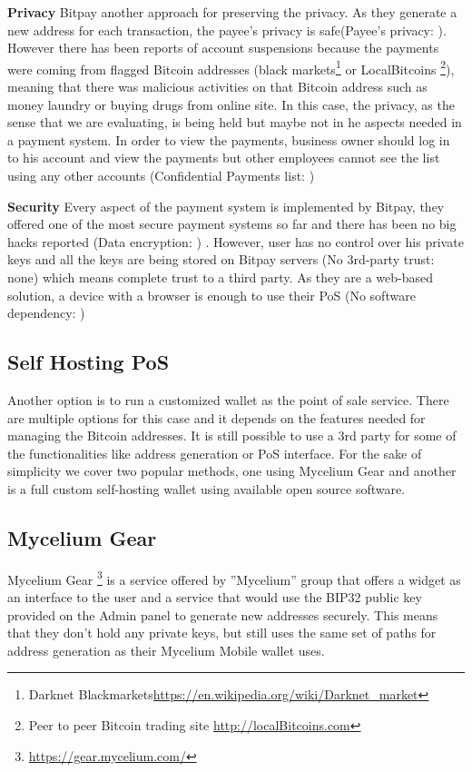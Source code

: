  \textbf{Privacy}
Bitpay another approach for preserving the privacy. As they generate a new address for each transaction, the payee's privacy is safe(Payee's privacy: \full). However there has been reports of account suspensions because the payments were coming from flagged Bitcoin addresses (\eg black markets\footnote{Darknet Blackmarkets\url{https://en.wikipedia.org/wiki/Darknet_market}} or LocalBitcoins \footnote{Peer to peer Bitcoin trading site \url{http://localBitcoins.com}}), meaning that there was malicious activities on that Bitcoin address such as money laundry or buying drugs from online site. In this case, the privacy, as the sense that we are evaluating, is being held but maybe not in he aspects needed in a payment system. In order to view the payments, business owner should log in to his account and view the payments but other employees cannot see the list using any other accounts (Confidential Payments list: \prt)

 \textbf{Security}
Every aspect of the payment system is implemented by Bitpay, they offered one of the most secure payment systems so far and there has been no big hacks reported (Data encryption: \prt) . However, user has no control over his private keys and all the keys are being stored on Bitpay servers (No 3rd-party trust: none) which means complete trust to a third party. As they are a web-based solution, a device with a browser is enough to use their PoS (No software dependency: \full)


\subsection{Self Hosting PoS}
Another option is to run a customized wallet as the point of sale service. There are multiple options for this case and it depends on the features needed for managing the Bitcoin addresses. It is still possible to use a 3rd party for some of the functionalities like address generation or PoS interface. For the sake of simplicity we cover two popular methods, one using Mycelium Gear and another is a full custom self-hosting wallet using available open source software.


\subsection{Mycelium Gear}
Mycelium Gear \footnote{\url{https://gear.mycelium.com/}} is a service offered by ''Mycelium'' group that offers a widget as an interface to the user and a service that would use the BIP32 public key provided on the Admin panel to generate new addresses securely. This means that they don't hold any private keys, but still uses the same set of paths for address generation as their Mycelium Mobile wallet uses.

